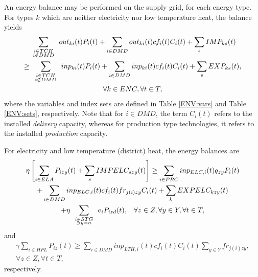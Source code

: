 An energy balance may be performed on the supply grid, for each energy type.  For types $k$ which are neither electricity nor low temperature heat, the balance yields
\begin{multline}
\label{ENV:equil}
\sum_{{\renewcommand{\arraystretch}{0.2} \begin{array}{c} \scriptstyle i\in TCH \\ \scriptstyle i\notin DMD \end{array}}} out_{ki}(t)P_i(t) + \sum_{i\in DMD} out_{ki}(t)cf_i(t) C_i(t) + \sum_s IMP_{ks}(t)\\
 \geq \sum_{{\renewcommand{\arraystretch}{0.2} \begin{array}{c} \scriptstyle i\in TCH \\ \scriptstyle i\notin DMD \end{array}}} inp_{ki}(t)P_i(t) + \sum_{i\in DMD} inp_{ki}(t)cf_i(t) C_i(t) + \sum_s EXP_{ks}(t),\\
\forall k\in ENC, \forall t\in T,
\end{multline}
where the variables and index sets are defined in Table \ref{ENV:vars} and Table \ref{ENV:sets}, respectively.  Note that for $i \in DMD$, the term $C_i(t)$ refers to the installed \emph{delivery} capacity, whereas for production type technologies, it refers to the installed \emph{production} capacity.

For electricity and low temperature (district) heat, the energy balances are
\begin{multline*}
\eta \left[ \sum_{i\in ELA} P_{izy}(t) + \sum_s IMPELC_{szy}(t)\right] \geq \sum_{i\in PRC} inp_{ELC,i}(t) q_{zy} P_i(t) \\
+ \sum_{i\in DMD} inp_{ELC,i}(t) cf_i(t) fr_{j(i)zy} C_i(t) 
+ \sum_k EXPELC_{kzy}(t) \\
+ \eta \sum_{{\renewcommand{\arraystretch}{0.2} \begin{array}{c} \scriptstyle i\in STG \\ \scriptstyle \ni y=n \end{array}}} e_i P_{izd}(t), \hspace{3mm} \forall z\in Z, \forall y\in Y, \forall t \in T,
\end{multline*}
and
\begin{multline*}
\gamma \sum_{i\in HPL} P_{iz}(t) \geq \sum_{i\in DMD} inp_{LTH,i}(t) cf_i(t) C_i(t) \sum_{y\in Y} fr_{j(i)zy},\\
 \forall z\in Z, \forall t\in T,
\end{multline*}
respectively.


